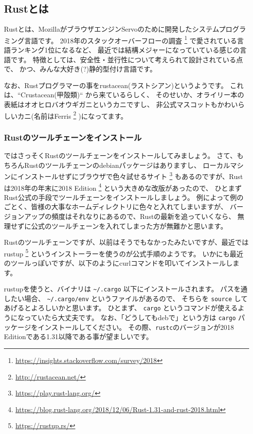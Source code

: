 \documentclass[mingoth,a4paper]{jsarticle}
\begin{document}
\subsection{Rustとは}

Rustとは、MozillaがブラウザエンジンServoのために開発したシステムプログラミング言語です。
2018年のスタックオーバーフローの調査%
\footnote{\url{https://insights.stackoverflow.com/survey/2018}}%
で愛されている言語ランキング1位になるなど、
最近では結構メジャーになっていている感じの言語です。
特徴としては、安全性・並行性について考えられて設計されている点で、
かつ、みんな大好き(?)静的型付け言語です。

なお、Rustプログラマーの事をrustacean(ラストシアン)というようです。
これは、``Crustacean(甲殻類)`` から来ているらしく、
そのせいか、オライリー本の表紙はオオヒロバオウギガニというカニですし、
非公式マスコットもかわいらしいカニ(名前はFerris%
\footnote{\url{http://rustacean.net/}}%
)になってます。

\subsubsection{Rustのツールチェーンをインストール}

ではさっそくRustのツールチェーンをインストールしてみましょう。
さて、もちろんRustのツールチェーンのdebianパッケージはありますし、
ローカルマシンにインストールせずにブラウザで色々試せるサイト%
\footnote{\url{https://play.rust-lang.org/}}
もあるのですが、Rustは2018年の年末に2018 Edition%
\footnote{\url{https://blog.rust-lang.org/2018/12/06/Rust-1.31-and-rust-2018.html}}%
という大きめな改版があったので、
ひとまずRust公式の手段でツールチェーンをインストールしましょう。
例によって例のごとく、皆様の大事なホームディレクトリに色々と入れてしまいますが、
バージョンアップの頻度はそれなりにあるので、Rustの最新を追っていくなら、
無理せずに公式のツールチェーンを入れてしまった方が無難かと思います。

Rustのツールチェーンですが、以前はそうでもなかったみたいですが、最近ではrustup%
\footnote{\url{https://rustup.rs/}}%
というインストーラーを使うのが公式手順のようです。
いかにも最近のツールっぽいですが、以下のようにcurlコマンドを叩いてインストールします。

\begin{commandline}
\end{commandline}

rustupを使うと、バイナリは \verb|~/.cargo| 以下にインストールされます。
パスを通したい場合、 \verb|~/.cargo/env| というファイルがあるので、
そちらを \texttt{source} してあげるとよろしいかと思います。
ひとまず、 \texttt{cargo} というコマンドが使えるようになっていたら大丈夫です。
なお、「どうしてもdebで」という方は \texttt{cargo} パッケージをインストールしてください。
その際、\texttt{rustc}のバージョンが2018 Editionである1.31以降である事が望ましいです。
\end{document}
